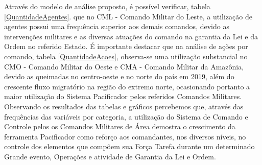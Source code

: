 Através do modelo de análise proposto, é possível verificar, tabela \ref{QuantidadeAgentes}. que no CML - Comando Militar do Leste, a utilização de agentes possui uma frequência superior aos demais comandos, devido as intervenções militares e as diversas atuações do comando na garantia da Lei e da Ordem no referido Estado. É importante destacar que na análise de ações por comando, tabela \ref{QuantidadeAcoes}, observa-se uma utilização substancial no CMO - Comando Militar do Oeste e CMA - Comando Militar da Amazônia, devido as queimadas no centro-oeste e no norte do país em 2019, além do crescente fluxo migratório na região do extremo norte, ocasionando portanto a maior utilização do Sistema Pacificador pelos referidos Comandos Militares. Observando os resultados das tabelas e gráficos percebemos que, através das frequências das variáveis por categoria, a utilização do Sistema de Comando e Controle pelos os Comandos Militares de Área demostra o crescimento da ferramenta Pacificador como reforço aos comandantes, nos diversos níveis, no controle dos elementos que compõem sua Força Tarefa durante um determinado Grande evento, Operações e atividade de Garantia da Lei e Ordem. 
 
